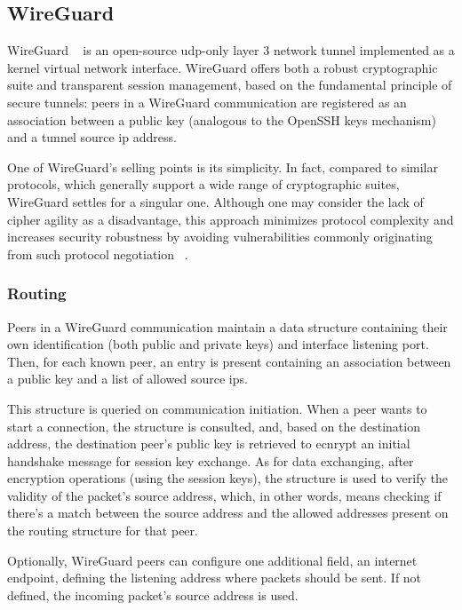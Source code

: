 \documentclass[11pt,twoside,a4paper]{report}
\begin{document}
\subsection{WireGuard}
\label{ss:wg}

WireGuard ~\cite{donenfeld2017wireguard} is an open-source \ac{udp}-only layer 3 network tunnel implemented as a kernel virtual network interface. WireGuard offers both a robust cryptographic suite and transparent session management, based on the fundamental principle of secure tunnels: peers in a WireGuard communication are registered as an association between a public key (analogous to the OpenSSH keys mechanism) and a tunnel source \ac{ip} address.

One of WireGuard's selling points is its simplicity. In fact, compared to similar protocols, which generally support a wide range of cryptographic suites, WireGuard settles for a singular one. Although one may consider the lack of cipher agility as a disadvantage, this approach minimizes protocol complexity and increases security robustness by avoiding vulnerabilities commonly originating from such protocol negotiation ~\cite{curguz2016vulnerabilities}.

\subsubsection{Routing}

Peers in a WireGuard communication maintain a data structure containing their own identification (both public and private keys) and interface listening port. Then, for each known peer, an entry is present containing an association between a public key and a list of allowed source \ac{ip}s.

This structure is queried on communication initiation. When a peer wants to start a connection, the structure is consulted, and, based on the destination address, the destination peer's public key is retrieved to ecnrypt an initial handshake message for session key exchange. As for data exchanging, after encryption operations (using the session keys), the structure is used to verify the validity of the packet's source address, which, in other words, means checking if there's a match between the source address and the allowed addresses present on the routing structure for that peer.

Optionally, WireGuard peers can configure one additional field, an internet endpoint, defining the listening address where packets should be sent. If not defined, the incoming packet's source address is used.
\end{document}

